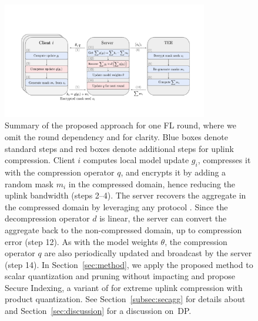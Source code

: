 \begin{figure}[t]
    \centering
    \includegraphics[width=0.8\textwidth]{figs/secagg_summary_new.pdf}
    \caption{\label{fig:secagg_summary}
    Summary of the proposed approach for one FL round, where we omit the round dependency and  for clarity. Blue boxes denote standard steps and red boxes denote additional steps for uplink compression. Client $i$ computes local model update $g_i$, compresses it with the compression operator $q$, and encrypts it by adding a random mask $m_i$ in the compressed domain, hence reducing the uplink bandwidth (steps 2--4). The server recovers the aggregate in the compressed domain by leveraging any \SecAgg protocol . Since the decompression operator $d$ is linear, the server can convert the aggregate back to the non-compressed domain, up to compression error (step 12). As with the model weights $\theta$, the compression operator $q$ are also periodically updated and broadcast by the server (step 14). 
    In Section~\ref{sec:method}, we apply the proposed method to scalar quantization and pruning without impacting \SecAgg and propose Secure Indexing, a variant of \SecAgg for extreme uplink compression with product quantization. See Section~\ref{subsec:secagg} for details about \SecAgg and Section~\ref{sec:discussion} for a discussion on~DP.
    }
    \vspace{-3mm}
\end{figure}






